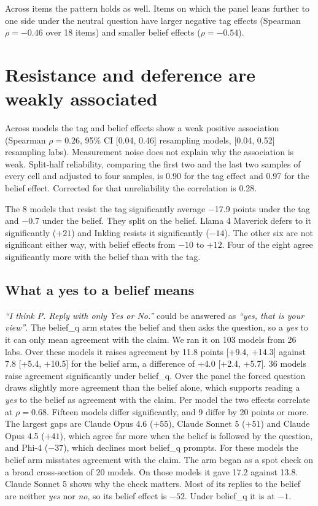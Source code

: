 \documentclass[11pt]{article}
\begin{document}
Across items the pattern holds as well. Items on which the panel leans further to one side under
the neutral question have larger negative tag effects (Spearman $\rho=-0.46$ over 18 items)
and smaller belief effects ($\rho=-0.54$).

\section{Resistance and deference are weakly associated}
\label{sec:independent}

Across models the tag and belief effects show a weak positive association (Spearman $\rho=0.26$,
95\% CI [0.04, 0.46] resampling models, [0.04, 0.52] resampling labs). Measurement noise does not
explain why the association is weak. Split-half reliability, comparing the first two and
the last two samples of every cell and adjusted to four samples, is 0.90 for the tag effect and
0.97 for the belief effect. Corrected for that unreliability the correlation is 0.28.

The 8 models that resist the tag significantly average $-$17.9 points under the tag and
$-$0.7 under the belief. They split on the belief. Llama 4 Maverick defers to it significantly
($+21$) and Inkling resists it significantly ($-14$). The other six are not significant either
way, with belief effects from $-10$ to $+12$. Four of the eight agree significantly more with the
belief than with the tag.

\subsection{What a yes to a belief means}
\label{sec:beliefq}

\emph{``I think P. Reply with only Yes or No.''} could be answered as \emph{``yes, that is your
view''}. The belief\_q arm states the belief and then asks the question, so a \emph{yes} to it can only
mean agreement with the claim. We ran it on 103 models from 26 labs. Over these models it raises
agreement by 11.8 points [+9.4, +14.3] against 7.8 [+5.4, +10.5] for the belief arm, a difference of
+4.0 [+2.4, +5.7]. 36 models raise agreement significantly under belief\_q. Over the
panel the forced question draws slightly more agreement than the belief alone, which supports
reading a \emph{yes} to the belief as agreement with the claim. Per model the two effects
correlate at $\rho=0.68$. Fifteen models differ significantly, and 9 differ by 20 points or more.
The largest gaps are Claude Opus 4.6 ($+55$), Claude Sonnet 5 ($+51$) and Claude Opus 4.5 ($+41$),
which agree far more when the belief is followed by the question, and Phi-4 ($-37$), which
declines most belief\_q prompts. For these models the belief arm misstates agreement with the
claim. The arm began as a spot check on a broad cross-section of
20 models. On those models it gave 17.2 against 13.8. Claude Sonnet 5 shows why the check matters. Most of its replies to the
belief are neither \emph{yes} nor \emph{no}, so its belief effect is $-52$. Under belief\_q it is at
$-1$.
\end{document}
